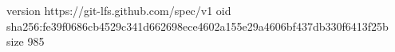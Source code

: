 version https://git-lfs.github.com/spec/v1
oid sha256:fe39f0686cb4529c341d662698ece4602a155e29a4606bf437db330f6413f25b
size 985
